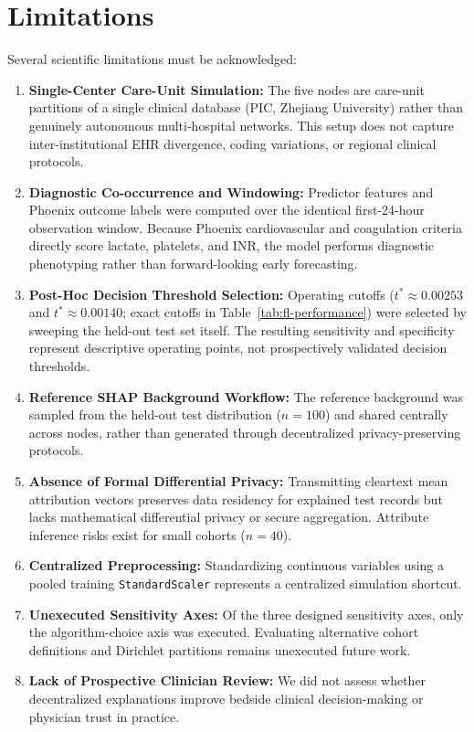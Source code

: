 \documentclass[sigconf,review,anonymous]{acmart}
\begin{document}
\section{Limitations}\label{sec:limitations}

Several scientific limitations must be acknowledged:
\begin{enumerate}
\item \textbf{Single-Center Care-Unit Simulation:} The five nodes are care-unit partitions of a single clinical database (PIC, Zhejiang University) rather than genuinely autonomous multi-hospital networks. This setup does not capture inter-institutional EHR divergence, coding variations, or regional clinical protocols.
\item \textbf{Diagnostic Co-occurrence and Windowing:} Predictor features and Phoenix outcome labels were computed over the identical first-24-hour observation window. Because Phoenix cardiovascular and coagulation criteria directly score lactate, platelets, and INR, the model performs diagnostic phenotyping rather than forward-looking early forecasting.
\item \textbf{Post-Hoc Decision Threshold Selection:} Operating cutoffs ($t^* \approx 0.00253$ and $t^* \approx 0.00140$; exact cutoffs in Table~\ref{tab:fl-performance}) were selected by sweeping the held-out test set itself. The resulting sensitivity and specificity represent descriptive operating points, not prospectively validated decision thresholds.
\item \textbf{Reference SHAP Background Workflow:} The reference background was sampled from the held-out test distribution ($n=100$) and shared centrally across nodes, rather than generated through decentralized privacy-preserving protocols.
\item \textbf{Absence of Formal Differential Privacy:} Transmitting cleartext mean attribution vectors preserves data residency for explained test records but lacks mathematical differential privacy or secure aggregation. Attribute inference risks exist for small cohorts ($n=40$).
\item \textbf{Centralized Preprocessing:} Standardizing continuous variables using a pooled training \texttt{StandardScaler} represents a centralized simulation shortcut.
\item \textbf{Unexecuted Sensitivity Axes:} Of the three designed sensitivity axes, only the algorithm-choice axis was executed. Evaluating alternative cohort definitions and Dirichlet partitions remains unexecuted future work.
\item \textbf{Lack of Prospective Clinician Review:} We did not assess whether decentralized explanations improve bedside clinical decision-making or physician trust in practice.
\end{enumerate}
\end{document}
